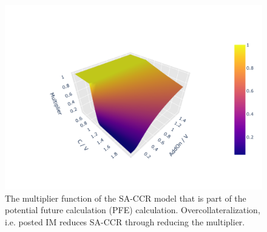 \documentclass[../Thesis_AHoecherl.tex]{subfiles}
\begin{document}

% 

\begin{figure}
	\centering
	\includegraphics[scale=0.9]{Graphics/SACCR_Multiplier_Function.pdf}
	\caption[Multiplier of the \gls{SA-CCR} model]{The multiplier function of the SA-CCR model that is part of the potential future calculation (PFE) calculation. Overcollateralization, i.e. posted IM reduces SA-CCR through reducing the multiplier.}
	\label{fig:multiplier}
\end{figure}

% 

% 



% 

% 

% 
\end{document}
